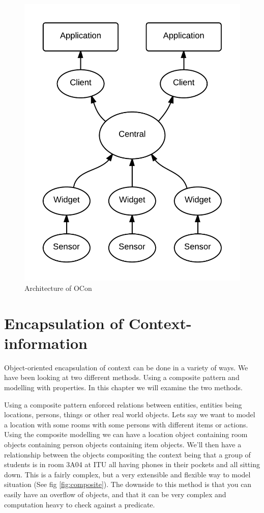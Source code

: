 \documentclass[../report.tex]{subfiles}
\begin{document}
\begin{figure}[H]
\centering
\includegraphics[scale=0.2]{grandarchitecture.png}
\caption{Architecture of OCon}
\label{fig:GrandArchitecture}
\end{figure}

\section{Encapsulation of Context-information}
Object-oriented encapsulation of context can be done in a variety of ways. We have been looking at two different methods. Using a composite pattern and modelling with properties. In this chapter we will examine the two methods.

Using a composite pattern enforced relations between entities, entities being locations, persons, things or other real world objects. Lets say we want to model a location with some rooms with some persons with different items or actions. Using the composite modelling we can have a location object containing room objects containing person objects containing item objects. We'll then have a relationship between the objects compositing the context being that a group of students is in room 3A04 at ITU all having phones in their pockets and all sitting down. This is a fairly complex, but a very extensible and flexible way to model situation (See fig \ref{fig:composite}). The downside to this method is that you can easily have an overflow of objects, and that it can be very complex and computation heavy to check against a predicate.
\end{document}
